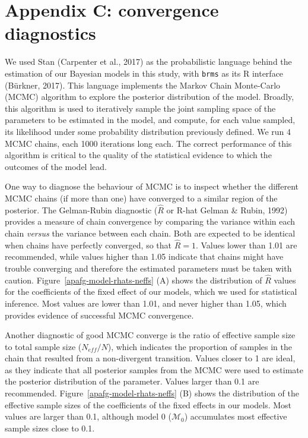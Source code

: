 \documentclass[
  man,
  floatsintext,
  colorlinks=true,linkcolor=blue,citecolor=blue,urlcolor=blue,biblatex]{apa7}
\begin{document}
\newpage{}

\newpage{}

\hypertarget{appendix-c-convergence-diagnostics}{%
\section*{Appendix C: convergence
diagnostics}\label{appendix-c-convergence-diagnostics}}

We used Stan (Carpenter et al., 2017) as the probabilistic language
behind the estimation of our Bayesian models in this study, with
\texttt{brms} as its R interface (Bürkner, 2017). This language
implements the Markov Chain Monte-Carlo (MCMC) algorithm to explore the
posterior distribution of the model. Broadly, this algorithm is used to
iteratively sample the joint sampling space of the parameters to be
estimated in the model, and compute, for each value sampled, its
likelihood under some probability distribution previously defined. We
run 4 MCMC chains, each 1000 iterations long each. The correct
performance of this algorithm is critical to the quality of the
statistical evidence to which the outcomes of the model lead.

One way to diagnose the behaviour of MCMC is to inspect whether the
different MCMC chains (if more than one) have converged to a similar
region of the posterior. The Gelman-Rubin diagnostic (\(\hat{R}\) or
R-hat Gelman \& Rubin, 1992) provides a measure of chain convergence by
comparing the variance within each chain \emph{versus} the variance
between each chain. Both are expected to be identical when chains have
perfectly converged, so that \(\hat{R} = 1\). Values lower than 1.01 are
recommended, while values higher than 1.05 indicate that chains might
have trouble converging and therefore the estimated parameters must be
taken with caution. Figure~\ref{apafg-model-rhats-neffs} (A) shows the
distribution of \(\hat{R}\) values for the coefficients of the fixed
effect of our models, which we used for statistical inference. Most
values are lower than 1.01, and never higher than 1.05, which provides
evidence of successful MCMC convergence.

Another diagnostic of good MCMC converge is the ratio of effective
sample size to total sample size (\(N_{eff}/N\)), which indicates the
proportion of samples in the chain that resulted from a non-divergent
transition. Values closer to 1 are ideal, as they indicate that all
posterior samples from the MCMC were used to estimate the posterior
distribution of the parameter. Values larger than 0.1 are recommended.
Figure~\ref{apafg-model-rhats-neffs} (B) shows the distribution of the
effective sample sizes of the coefficients of the fixed effects in our
models. Most values are larger than 0.1, although model 0
(\(\mathcal{M}_0\)) accumulates most effective sample sizes close to
0.1.
\end{document}
